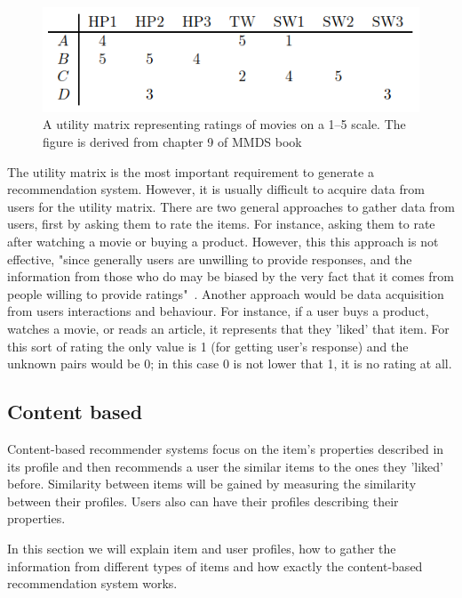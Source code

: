 \begin{figure}[ht]
  \centering
  \includegraphics[width=\textwidth]{figures/utilityMatrix.png}
  \caption{A utility matrix representing ratings of movies on a 1–5 scale. The figure is derived from chapter 9 of MMDS book~\cite{rajaraman2011mining}}
  \label{fig:utilityMatrix}
\end{figure} 


The utility matrix is the most important requirement to generate a recommendation system. However, it is usually difficult to acquire data from users for the utility matrix. There are two general approaches to gather data from users, first by asking them to rate the items. For instance, asking them to rate after watching a movie or buying a product. However, this this approach is not eﬀective, "since generally
users are unwilling to provide responses, and the information from those
who do may be biased by the very fact that it comes from people willing
to provide ratings"~\cite{rajaraman2011mining}. Another approach would be data acquisition from users interactions and behaviour. For instance, if a user
buys a product, watches a movie, or reads an article, it represents that they 'liked' that item. For this sort of rating the only value is 1 (for getting user's response) and the unknown pairs would be 0; in this case 0 is not lower that 1, it is no rating at all.

\subsection{Content based}
Content-based recommender systems focus on the item's properties described in its profile and then recommends a user the similar items to the ones they 'liked' before. Similarity between items will be gained by measuring the similarity between their profiles. Users also can have their profiles describing their properties.

In this section we will explain item and user profiles, how to gather the information from different types of items and how exactly the content-based recommendation system works. 

